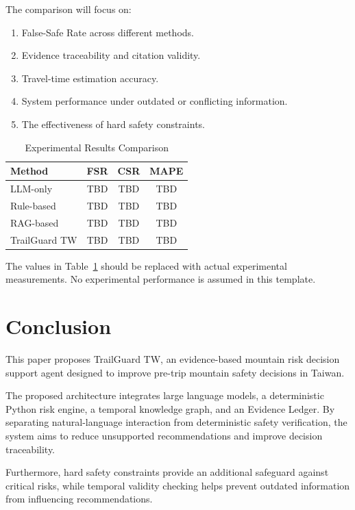 \documentclass[conference]{IEEEtran}
\begin{document}
The comparison will focus on:

\begin{enumerate}
    \item False-Safe Rate across different methods.
    \item Evidence traceability and citation validity.
    \item Travel-time estimation accuracy.
    \item System performance under outdated or conflicting
    information.
    \item The effectiveness of hard safety constraints.
\end{enumerate}

\begin{table}[!t]
\centering
\caption{Experimental Results Comparison}
\label{tab:results}
\begin{tabular}{lccc}
\toprule
Method & FSR & CSR & MAPE \\
\midrule
LLM-only & TBD & TBD & TBD \\
Rule-based & TBD & TBD & TBD \\
RAG-based & TBD & TBD & TBD \\
TrailGuard TW & TBD & TBD & TBD \\
\bottomrule
\end{tabular}
\end{table}

The values in Table~\ref{tab:results} should be replaced with
actual experimental measurements. No experimental performance
is assumed in this template.

\section{Conclusion}

This paper proposes TrailGuard TW, an evidence-based mountain
risk decision support agent designed to improve pre-trip
mountain safety decisions in Taiwan.

The proposed architecture integrates large language models,
a deterministic Python risk engine, a temporal knowledge graph,
and an Evidence Ledger. By separating natural-language
interaction from deterministic safety verification, the system
aims to reduce unsupported recommendations and improve
decision traceability.

Furthermore, hard safety constraints provide an additional
safeguard against critical risks, while temporal validity
checking helps prevent outdated information from influencing
recommendations.
\end{document}
